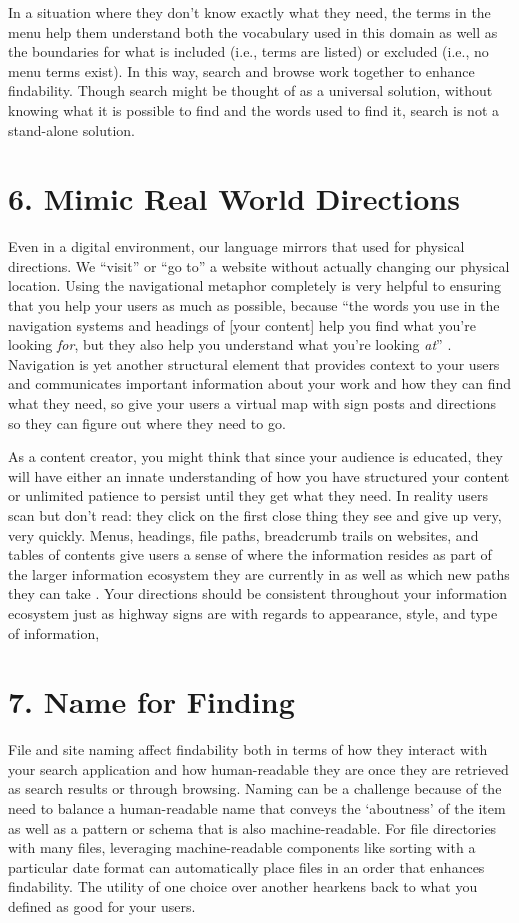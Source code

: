 \documentclass[10pt,letterpaper]{article}
\newcommand{\rulemajor}[1]{\section*{#1}}
\begin{document}
In a situation where they don't know exactly what they need, the terms
in the menu help them understand both the vocabulary used in this domain
as well as the boundaries for what is included (i.e., terms are listed)
or excluded (i.e., no menu terms exist). In this way, search and browse
work together to enhance findability.
Though search might be thought of as a universal solution, without
knowing what it is possible to find and the words used to find it,
search is not a stand-alone solution.

\rulemajor{6. Mimic Real World Directions}

Even in a digital environment, our language mirrors that used for
physical directions. We ``visit'' or ``go to'' a website without actually
changing our physical location. Using the navigational metaphor
completely is very helpful to ensuring that you help your users as much
as possible, because ``the words you use in the navigation systems and
headings of [your content] help you find what you're looking
\emph{for}, but they also help you understand what you're looking
\emph{at}'' \cite{Arango2018}. Navigation is yet another structural element that
provides context to your users and communicates important information
about your work and how they can find what they need, so give your users
a virtual map with sign posts and directions so they can figure out
where they need to go.

As a content creator, you might think that since your audience is
educated, they will have either an innate understanding of how you have
structured your content or unlimited patience to persist until they get
what they need. In reality users scan but don't read: they click on the
first close thing they see and give up very, very quickly. Menus,
headings, file paths, breadcrumb trails on websites, and tables of
contents give users a sense of where the information resides as part of
the larger information ecosystem they are currently in as well as which
new paths they can take \cite{Krug2014}. Your directions should be consistent
throughout your information ecosystem just as highway signs are with
regards to appearance, style, and type of information,

\rulemajor{7. Name for Finding}

File and site naming affect findability both in terms of how they
interact with your search application and how human-readable they are
once they are retrieved as search results or through browsing. Naming
can be a challenge because of the need to balance a human-readable name
that conveys the `aboutness' of the item as well as a pattern or schema
that is also machine-readable. For file directories with many files,
leveraging machine-readable components like sorting with a particular
date format can automatically place files in an order that enhances
findability. The utility of one choice over another hearkens back to
what you defined as good for your users.
\end{document}
